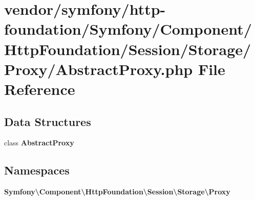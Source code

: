 \section{vendor/symfony/http-\/foundation/\+Symfony/\+Component/\+Http\+Foundation/\+Session/\+Storage/\+Proxy/\+Abstract\+Proxy.php File Reference}
\label{_abstract_proxy_8php}
\subsection*{Data Structures}
\begin{DoxyCompactItemize}
\item 
class {\bf Abstract\+Proxy}
\end{DoxyCompactItemize}
\subsection*{Namespaces}
\begin{DoxyCompactItemize}
\item 
 {\bf Symfony\textbackslash{}\+Component\textbackslash{}\+Http\+Foundation\textbackslash{}\+Session\textbackslash{}\+Storage\textbackslash{}\+Proxy}
\end{DoxyCompactItemize}
